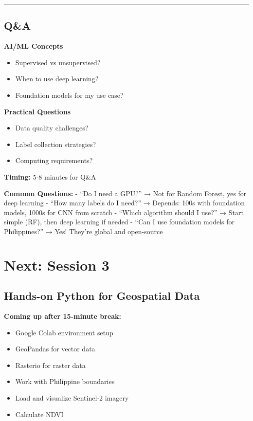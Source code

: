 \documentclass[
  letterpaper,
  DIV=11,
  numbers=noendperiod]{scrartcl}
\providecommand{\tightlist}{%
  \setlength{\itemsep}{0pt}\setlength{\parskip}{0pt}}
\begin{document}
\begin{center}\rule{0.5\linewidth}{0.5pt}\end{center}

\subsection{Q\&A}\label{qa}

\textbf{AI/ML Concepts}

\begin{itemize}
\tightlist
\item
  Supervised vs unsupervised?
\item
  When to use deep learning?
\item
  Foundation models for my use case?
\end{itemize}

\textbf{Practical Questions}

\begin{itemize}
\tightlist
\item
  Data quality challenges?
\item
  Label collection strategies?
\item
  Computing requirements?
\end{itemize}

\textbf{Timing:} 5-8 minutes for Q\&A

\textbf{Common Questions:} - ``Do I need a GPU?'' → Not for Random
Forest, yes for deep learning - ``How many labels do I need?'' →
Depends: 100s with foundation models, 1000s for CNN from scratch -
``Which algorithm should I use?'' → Start simple (RF), then deep
learning if needed - ``Can I use foundation models for Philippines?'' →
Yes! They're global and open-source

\section{Next: Session 3}\label{next-session-3}

\subsection{Hands-on Python for Geospatial
Data}\label{hands-on-python-for-geospatial-data}

\textbf{Coming up after 15-minute break:}

\begin{itemize}
\tightlist
\item
  Google Colab environment setup
\item
  GeoPandas for vector data
\item
  Rasterio for raster data
\item
  Work with Philippine boundaries
\item
  Load and visualize Sentinel-2 imagery
\item
  Calculate NDVI
\end{itemize}
\end{document}
